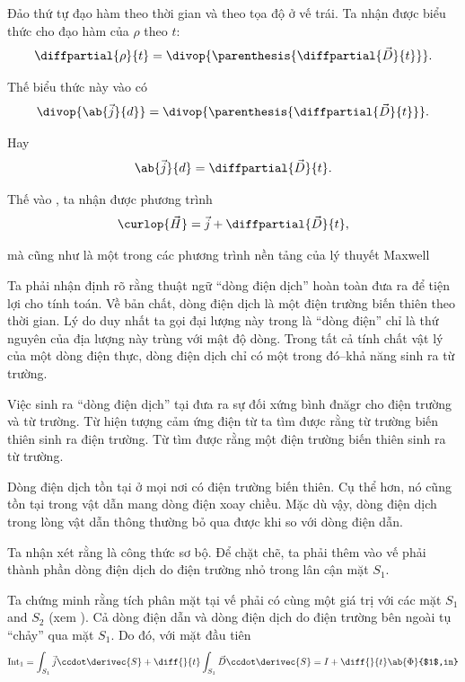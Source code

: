 \noindent

Đảo thứ tự đạo hàm theo thời gian và theo tọa độ ở vế trái.
Ta nhận được biểu thức cho đạo hàm của $\rho$ theo $t$:
\begin{equation*}
    \diffpartial{\rho}{t} = \divop{\parenthesis{ \diffpartial{\vec{D}}{t} }}.
\end{equation*}

\noindent
Thế biểu thức này vào  có
\begin{equation*}
    \divop{\ab{\vec{j}}{d}} = \divop{\parenthesis{ \diffpartial{\vec{D}}{t} }}.
\end{equation*}

\noindent
Hay
\begin{equation}\label{eq:9_12}
    \ab{\vec{j}}{d} = \diffpartial{\vec{D}}{t}.
\end{equation}

Thế  vào , ta nhận được phương trình
\begin{equation}\label{eq:9_13}
    \curlop{\vec{H}} = \vec{j} + \diffpartial{\vec{D}}{t},
\end{equation}

\noindent
mà cũng như  là một trong các phương trình nền tảng của lý thuyết Maxwell

Ta phải nhận định rõ rằng thuật ngữ ``dòng điện dịch'' hoàn toàn đưa ra để tiện lợi cho tính toán.
Về bản chất, dòng điện dịch là một điện trường biến thiên theo thời gian.
Lý do duy nhất ta gọi đại lượng này trong  là ``dòng điện'' chỉ là thứ nguyên của địa lượng này trùng với mật độ dòng.
Trong tất cả tính chất vật lý của một dòng điện thực, dòng điện dịch chỉ có một trong đó--khả năng sinh ra từ trường.

Việc sinh ra ``dòng điện dịch'' tại  đưa ra sự đối xứng bình đnăgr cho điện trường và từ trường.
Từ hiện tượng cảm ứng điện từ ta tìm được rằng từ trường biến thiên sinh ra điện trường.
Từ  tìm được rằng một điện trường biến thiên sinh ra từ trường.

Dòng điện dịch tồn tại ở mọi nơi có điện trường biến thiên.
Cụ thể hơn, nó cũng tồn tại trong vật dẫn mang dòng điện xoay chiều.
Mặc dù vậy, dòng điện dịch trong lòng vật dẫn thông thường bỏ qua được khi so với dòng điện dẫn.

Ta nhận xét rằng  là công thức sơ bộ.
Để chặt chẽ, ta phải thêm vào vế phải thành phần dòng điện dịch do điện trường nhỏ trong lân cận mặt $S_1$.

Ta chứng minh rằng tích phân mặt tại vế phải  có cùng một giá trị với các mặt $S_1$ and $S_2$ (xem ).
Cả dòng điện dẫn và dòng điện dịch do điện trường bên ngoài tụ ``chảy'' qua mặt $S_1$.
Do đó, với mặt đầu tiên
\begin{equation*}
    \text{Int}_1 = \int_{S_1} \vec{j} \ccdot \derivec{S} + \diff{}{t} \int_{S_1} \vec{D} \ccdot \derivec{S} = I + \diff{}{t} \ab{\Phi}{$1$,in}
\end{equation*}

